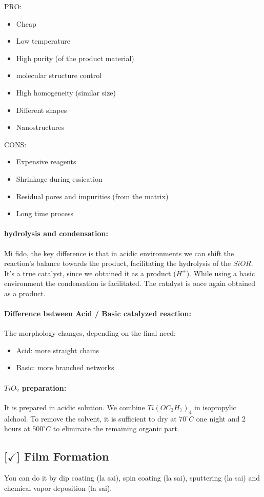 PRO:
\begin{itemize}
    \item Cheap
    \item Low temperature
    \item High purity (of the product material)
    \item molecular structure control
    \item High homogeneity (similar size)
    \item Different shapes
    \item Nanostructures
\end{itemize}

CONS:
\begin{itemize}
    \item Expensive reagents
    \item Shrinkage during essication
    \item Residual pores and impurities (from the matrix)
    \item Long time process
\end{itemize}

\paragraph{hydrolysis and condensation:} Mi fido, the key difference is that in acidic environments we can shift the reaction's balance towards the product, facilitating the hydrolysis of the $SiOR$. It's a true catalyst, since we obtained it as a product ($H^+$). While using a basic environment the condensation is facilitated. The catalyst is once again obtained as a product.

\paragraph{Difference between Acid / Basic catalyzed reaction: }
The morphology changes, depending on the final need:
\begin{itemize}
    \item Acid: more straight chains
    \item Basic: more branched networks
\end{itemize}

\paragraph{$TiO_2$ preparation: } It is prepared in acidic solution. We combine $Ti(OC_3H_7)_4$ in isopropylic alchool. To remove the solvent, it is sufficient to dry at $70^{\circ}C$ one night and 2 hours at $500^{\circ}C$ to eliminate the remaining organic part.

\subsection{[$\checkmark$] Film Formation}

You can do it by dip coating (la sai), spin coating (la sai), sputtering (la sai) and chemical vapor deposition (la sai).
